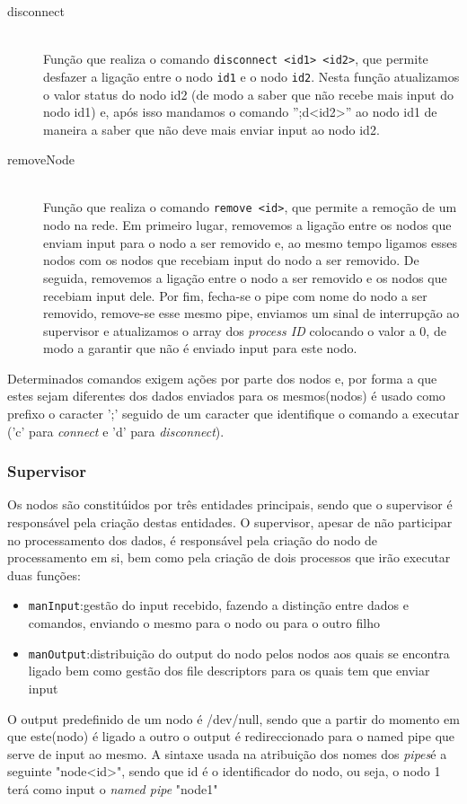 \documentclass[12pt]{article}
\begin{document}
\begin{description}
\item[disconnect] \hfill \\
    Função que realiza o comando \texttt{disconnect <id1> <id2>}, que permite desfazer a ligação entre o nodo \texttt{id1} e o nodo \texttt{id2}. Nesta função atualizamos o valor status do nodo id2 (de modo a saber que não recebe mais input do nodo id1) e, após isso mandamos o comando '';d<id2>'' ao nodo id1 de maneira a saber que não deve mais enviar input ao nodo id2. 

\item[removeNode] \hfill \\
    Função que realiza o comando \texttt{remove <id>}, que permite a remoção de um nodo na rede. Em primeiro lugar, removemos a ligação entre os nodos que enviam input para o nodo a ser removido e, ao mesmo tempo ligamos esses nodos com os nodos que recebiam input do nodo a ser removido. De seguida, removemos a ligação entre o nodo a ser removido e os nodos que recebiam input dele. Por fim, fecha-se o pipe com nome do nodo a ser removido, remove-se esse mesmo pipe, enviamos um sinal de interrupção ao supervisor e atualizamos o array dos \textit{process ID} colocando o valor a 0, de modo a garantir que não é enviado input para este nodo.
\end{description}

Determinados comandos exigem ações por parte dos nodos e, por forma a que estes sejam diferentes dos dados enviados para os mesmos(nodos) é usado como prefixo o caracter ';' seguido de um caracter que identifique o comando a executar ('c' para \textit{connect} e 'd' para \textit{disconnect}).

\subsubsection{Supervisor}
Os nodos são constitúidos por três entidades principais, sendo que o supervisor é responsável pela criação destas entidades.
O supervisor, apesar de não participar no processamento dos dados, é responsável pela criação do nodo de processamento em si, bem como pela criação de dois processos que irão executar duas funções: 
\begin{itemize}
\item \texttt{manInput}:gestão do input recebido, fazendo a distinção entre dados e comandos, enviando o mesmo para o nodo ou para o outro filho
\item \texttt{manOutput}:distribuição do output do nodo pelos nodos aos quais se encontra ligado bem como gestão dos file descriptors para os quais tem que enviar input
\end{itemize}
O output predefinido de um nodo é /dev/null, sendo que a partir do momento em que este(nodo) é ligado a outro o output é redireccionado para o named pipe que serve de input ao mesmo. A sintaxe usada na atribuição dos nomes dos \textit{pipes}é a seguinte "node<id>", sendo que id é o identificador do nodo, ou seja, o nodo 1 terá como input o \textit{named pipe} "node1"
\end{document}
